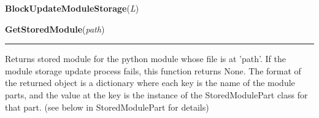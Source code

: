     \label{System:Storage:BlockUpdateModuleStorage}

    \vspace{0.5ex}

\hspace{.8\funcindent}\begin{boxedminipage}{\funcwidth}

    \raggedright \textbf{BlockUpdateModuleStorage}(\textit{L})

\setlength{\parskip}{2ex}
\setlength{\parskip}{1ex}
    \end{boxedminipage}

    \label{System:Storage:GetStoredModule}

    \vspace{0.5ex}

\hspace{.8\funcindent}\begin{boxedminipage}{\funcwidth}

    \raggedright \textbf{GetStoredModule}(\textit{path})

    \vspace{-1.5ex}

    \rule{\textwidth}{0.5\fboxrule}
\setlength{\parskip}{2ex}
    Returns stored module for the python module whose file is at 'path'. If
    the module storage update process fails, this function returns None. 
    The format of the returned object is a dictionary where each key is the
    name of the module parts, and the value at the key is the instance of 
    the StoredModulePart class for that part.  (see below in 
    StoredModulePart for details)

\setlength{\parskip}{1ex}
    \end{boxedminipage}

    \label{System:Storage:GetStoredModuleTimes}

    \vspace{0.5ex}

